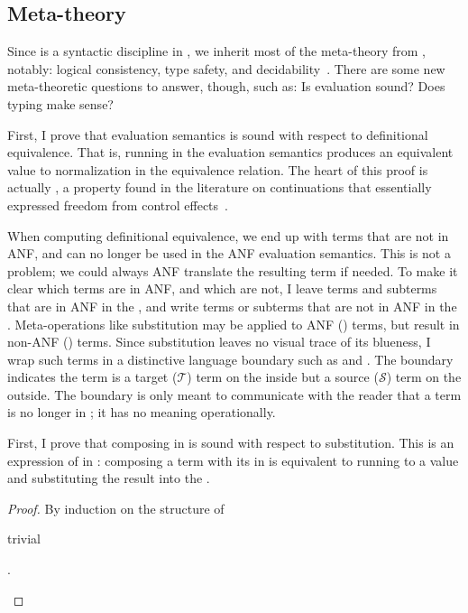\subsection{Meta-theory}
{
\allowdisplaybreaks %
Since \tlang is a syntactic discipline in \slang, we inherit most of the
meta-theory from \slang, notably: logical consistency, type safety, and
decidability~\cite{luo1989,severi1994:dpts}.
There are some new meta-theoretic questions to answer, though, such as: Is
 evaluation sound? Does  typing make sense?

First, I prove that  evaluation semantics is sound with respect to
definitional equivalence.
That is, running in the  evaluation semantics produces an equivalent
value to normalization in the equivalence relation.
The heart of this proof is actually \emph{}, a property found
in the literature on continuations that essentially expressed freedom from
control effects~\cite{thielecke2003}.

When computing definitional equivalence, we end up with terms that are not in
ANF, and can no longer be used in the ANF evaluation semantics.
This is not a problem; we could always ANF translate the resulting term if needed.
To make it clear which terms are in ANF, and which are not, I leave terms and subterms that are
in ANF in the , and write terms or subterms that are not in ANF
in the .
Meta-operations like substitution may be applied to ANF () terms,
but result in non-ANF () terms.
Since substitution leaves no visual trace of its blueness, I wrap such terms in
a distinctive language boundary such as \im{\sbound{\subst{\tM}{\tMpr}{\tx}}}
and \im{\sbound{\tK\hw{\tM}}}.
The boundary indicates the term is a target (\(\mathcal{T}\)) term on the inside
but a source (\(\mathcal{S}\)) term on the outside.
The boundary is only meant to communicate with the reader that a term is no
longer in ; it has no meaning operationally.

First, I prove that composing  in  is sound with
respect to substitution.
This is an expression of  in : composing a term
\im{\tM} with its  \im{\tK} in  is equivalent to running
\im{\tM} to a value and substituting the result into the  \im{\tK}.
\begin{lemma}[Naturality]
  \label{lem:anf:tgt:het-sound}
  \im{\tK\hhw{\tM} \equiv \sbound{\tK\hw{\tM}}}
\end{lemma}
\begin{proof}
  By induction on the structure of \im{\tM}
  \begin{proofcases}
    \item \im{\tM = \tN} trivial
    \item \im{\tM = \tlete{\tx}{\tNpr}{\tMpr}}.


\end{proofcases}
\end{proof}}
